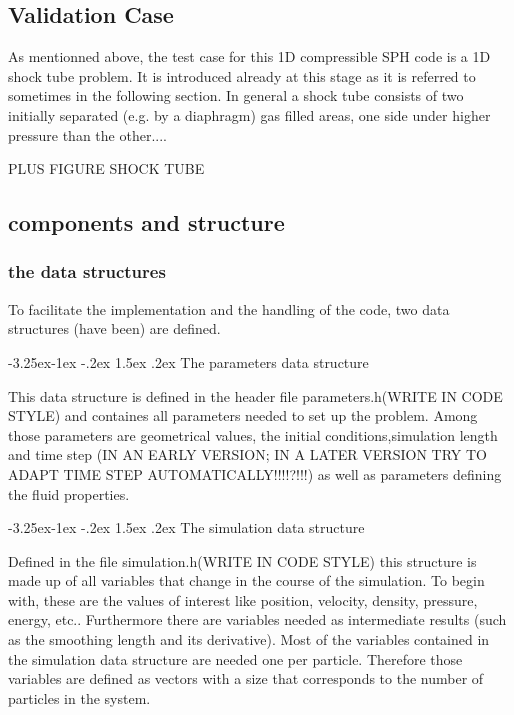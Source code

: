 \documentclass{report}
\makeatletter
\renewcommand\paragraph{\@startsection{paragraph}{4}{\z@}%
  {-3.25ex\@plus -1ex \@minus -.2ex}%
  {1.5ex \@plus .2ex}%
  {\normalfont\normalsize\bfseries}}
\makeatother
\begin{document}
\subsection{Validation Case}
As mentionned above, the test case for this 1D compressible SPH code is a 1D shock tube problem. It is introduced already at this stage as it is referred to sometimes in the following section.
In general a shock tube consists of two initially separated (e.g. by a diaphragm) gas filled areas, one side under higher pressure than the other....

PLUS FIGURE SHOCK TUBE

\subsection{components and structure}


\subsubsection{the data structures}

To facilitate the implementation and the handling of the code, two data structures (have been) are defined. 

\paragraph{The parameters data structure}

This data structure is defined in the header file parameters.h(WRITE IN CODE STYLE) and containes all parameters needed to set up the problem. Among those parameters are geometrical values, the initial conditions,simulation length and time step (IN AN EARLY VERSION; IN A LATER VERSION TRY TO ADAPT TIME STEP AUTOMATICALLY!!!!?!!!) as well as parameters defining the fluid properties.

\paragraph{The simulation data structure}

Defined in the file simulation.h(WRITE IN CODE STYLE) this structure is made up of all variables that change in the course of the simulation. To begin with, these are the values of interest like position, velocity, density, pressure, energy, etc.. Furthermore there are variables needed as intermediate results (such as the smoothing length and its derivative). 
Most of the variables contained in the simulation data structure are needed one per particle. Therefore those variables are defined as vectors with a size that corresponds to the number of particles in the system. 
\end{document}
